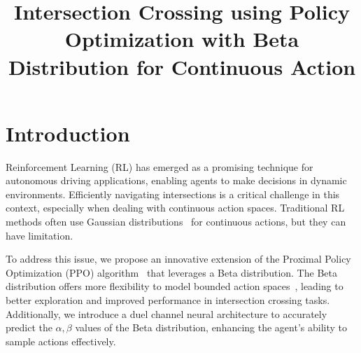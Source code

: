 


\title{Intersection Crossing using Policy Optimization with Beta Distribution for Continuous Action}

\author{
\and
{}
}

\maketitle



\section{Introduction}\label{sec:introduction}
Reinforcement Learning (RL) has emerged as a promising technique for autonomous driving applications, enabling agents to make decisions in dynamic environments. Efficiently navigating intersections is a critical challenge in this context, especially when dealing with continuous action spaces. Traditional RL methods often use Gaussian distributions~\cite{sutton2018reinforcement, capasso2021endtoend} for continuous actions, but they can have limitation.

To address this issue, we propose an innovative extension of the Proximal Policy Optimization (PPO) algorithm~\cite{schulman2017proximal} that leverages a Beta distribution. The Beta distribution offers more flexibility to model bounded action spaces~\cite{petrazzini2021proximal}, leading to better exploration and improved performance in intersection crossing tasks. Additionally, we introduce a duel channel neural architecture to accurately predict the $\alpha,\beta$ values of the Beta distribution, enhancing the agent's ability to sample actions effectively.

